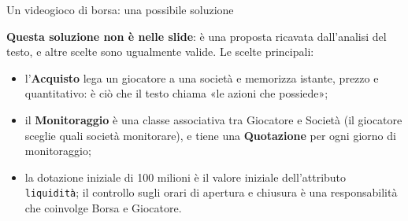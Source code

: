 \begin{esempio}{Un videogioco di borsa: una possibile soluzione}
\begin{center}
\end{center}
\textbf{Questa soluzione non è nelle slide}: è una proposta ricavata dall'analisi del testo, e altre scelte sono ugualmente valide.
Le scelte principali:
\begin{itemize}
  \item l'\textbf{Acquisto} lega un giocatore a una società e memorizza istante, prezzo e quantitativo: è ciò che il testo chiama
        «le azioni che possiede»;
  \item il \textbf{Monitoraggio} è una classe associativa tra Giocatore e Società (il giocatore sceglie quali società monitorare),
        e tiene una \textbf{Quotazione} per ogni giorno di monitoraggio;
  \item la dotazione iniziale di 100 milioni è il valore iniziale dell'attributo \texttt{liquidità}; il controllo sugli orari di
        apertura e chiusura è una responsabilità che coinvolge Borsa e Giocatore.
\end{itemize}
\end{esempio}

